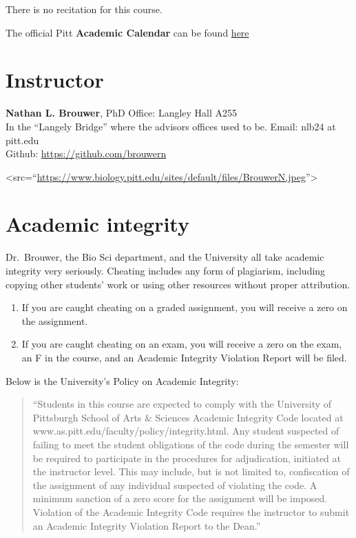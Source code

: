 \documentclass[
]{book}
\providecommand{\tightlist}{%
  \setlength{\itemsep}{0pt}\setlength{\parskip}{0pt}}
\begin{document}
There is no recitation for this course.

The official Pitt \textbf{Academic Calendar} can be found \href{https://www.registrar.pitt.edu/sites/default/files/pdf/Academic\%20Calendar\%202022-2023_Apple.pdf}{here}

\hypertarget{nlb}{%
\chapter{Instructor}\label{nlb}}

\textbf{Nathan L. Brouwer}, PhD
Office: Langley Hall A255\\
In the ``Langely Bridge'' where the advisors offices used to be.
Email: nlb24 at pitt.edu\\
Github: \url{https://github.com/brouwern}

\textless src=``\url{https://www.biology.pitt.edu/sites/default/files/BrouwerN.jpeg}''\textgreater{}

\hypertarget{academic-integrity}{%
\chapter{Academic integrity}\label{academic-integrity}}

Dr.~Brouwer, the Bio Sci department, and the University all take academic integrity very seriously. Cheating includes any form of plagiarism, including copying other students' work or using other resources without proper attribution.

\begin{enumerate}
\def\labelenumi{\arabic{enumi}.}
\tightlist
\item
  If you are caught cheating on a graded assignment, you will receive a zero on the assignment.
\item
  If you are caught cheating on an exam, you will receive a zero on the exam, an F in the course, and an Academic Integrity Violation Report will be filed.
\end{enumerate}

Below is the University's Policy on Academic Integrity:

\begin{quote}
``Students in this course are expected to comply with the University of Pittsburgh School of Arts \& Sciences Academic Integrity Code located at www.as.pitt.edu/faculty/policy/integrity.html. Any student suspected of failing to meet the student obligations of the code during the semester will be required to participate in the procedures for adjudication, initiated at the instructor level. This may include, but is not limited to, confiscation of the assignment of any individual suspected of violating the code. A minimum sanction of a zero score for the assignment will be imposed. Violation of the Academic Integrity Code requires the instructor to submit an Academic Integrity Violation Report to the Dean.''
\end{quote}
\end{document}
